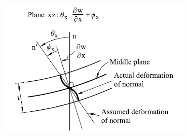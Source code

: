 \documentclass[9pt]{beamer}
\begin{document}
\begin{frame}
\begin{columns}
\begin{figure}[h!]
  \includegraphics[width=1\linewidth,trim={0 0 0 0},clip]{RMplate.png}
\end{figure}


\end{columns}

\end{frame}
\end{document}
